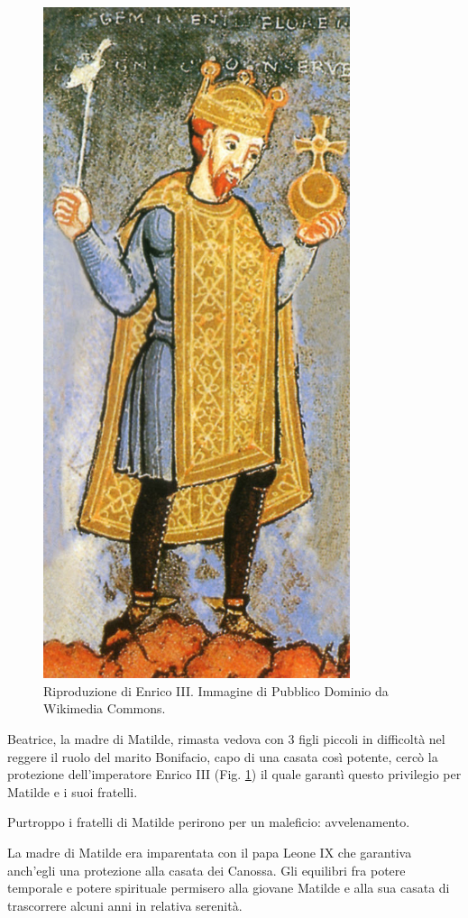\documentclass[letterpaper,twocolumn,openany,nodeprecatedcode]{dndbook}
\begin{document}
\begin{figure}
\centering
\includegraphics[width=9cm]{./img/enrico3.png}
\caption{Riproduzione di Enrico III. Immagine di Pubblico Dominio da Wikimedia Commons.}
\label{enrico3}
\end{figure}


Beatrice, la madre di Matilde, rimasta vedova con 3 figli piccoli in difficoltà nel reggere il ruolo del marito Bonifacio, capo di una casata così potente, cercò la protezione dell'imperatore Enrico III (Fig. \ref{enrico3}) il quale garantì questo privilegio per Matilde e i suoi fratelli.

Purtroppo i fratelli di Matilde perirono per un maleficio: avvelenamento.

La madre di Matilde era imparentata con il papa Leone IX che garantiva anch'egli una protezione alla casata dei Canossa. Gli equilibri fra potere temporale e potere spirituale permisero alla giovane Matilde e alla sua casata di trascorrere alcuni anni in relativa serenità.
\end{document}
